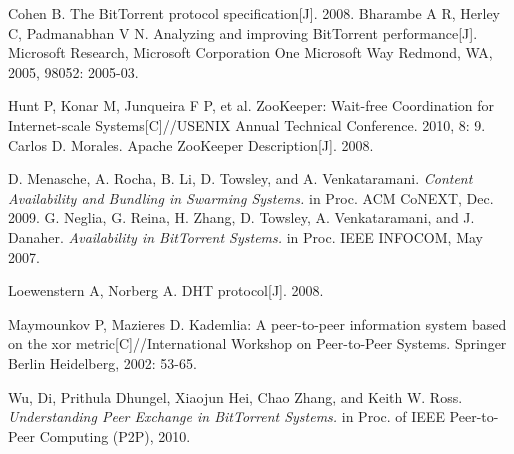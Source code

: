 \documentclass[conference]{IEEEtran}
\begin{document}
	\begin{thebibliography}{10}
		
		Cohen B. The BitTorrent protocol specification[J]. 2008.
		Bharambe A R, Herley C, Padmanabhan V N. Analyzing and improving BitTorrent performance[J]. Microsoft Research, Microsoft Corporation One Microsoft Way Redmond, WA, 2005, 98052: 2005-03.
		
		Hunt P, Konar M, Junqueira F P, et al. ZooKeeper: Wait-free Coordination for Internet-scale Systems[C]//USENIX Annual Technical Conference. 2010, 8: 9.
		Carlos D. Morales. Apache ZooKeeper Description[J]. 2008.

		D. Menasche, A. Rocha, B. Li, D. Towsley, and A. Venkataramani.  \emph{Content Availability and Bundling in Swarming Systems.} in Proc. ACM CoNEXT, Dec. 2009.
		G. Neglia, G. Reina, H. Zhang, D. Towsley, A. Venkataramani, and J. Danaher. \emph{Availability in BitTorrent Systems.} in Proc. IEEE INFOCOM, May 2007.
		
		Loewenstern A, Norberg A. DHT protocol[J]. 2008.
		
		Maymounkov P, Mazieres D. Kademlia: A peer-to-peer information system based on the xor metric[C]//International Workshop on Peer-to-Peer Systems. Springer Berlin Heidelberg, 2002: 53-65.
		
		Wu, Di, Prithula Dhungel, Xiaojun Hei, Chao Zhang, and Keith W. Ross. \emph{Understanding Peer Exchange in BitTorrent Systems.} in Proc. of IEEE Peer-to-Peer Computing (P2P), 2010.
		

		
		
		
		
	\end{thebibliography}
	
	
	
\end{document}
